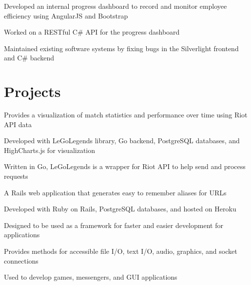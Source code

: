 \documentclass[]{peter_resume}
\begin{document}
\begin{minipage}[t]{0.74\textwidth}
\begin{tightemize}
\item Developed an internal progress dashboard to record and monitor employee efficiency using AngularJS and Bootstrap
\item Worked on a RESTful C\# API for the progress dashboard
\item Maintained existing software systems by fixing bugs in the Silverlight frontend and C\# backend
\end{tightemize}
\sectionsep


\section{Projects}

\begin{tightemize}
\item Provides a visualization of match statistics and performance over time using Riot API data
\item Developed with LeGoLegends library, Go backend, PostgreSQL databases, and HighCharts.js for visualization
\end{tightemize} 
\sectionsep

\begin{tightemize}
\item Written in Go, LeGoLegends is a wrapper for Riot API to help send and process requests
\end{tightemize} 
\sectionsep

\begin{tightemize}
\item A Rails web application that generates easy to remember aliases for URLs
\item Developed with Ruby on Rails, PostgreSQL databases, and hosted on Heroku
\end{tightemize}
\sectionsep

\begin{tightemize}
\item Designed to be used as a framework for faster and easier development for applications
\item Provides methods for accessible file I/O, text I/O, audio, graphics, and socket connections
\item Used to develop games, messengers, and GUI applications
\end{tightemize}
\sectionsep


\end{minipage}
\end{document}
